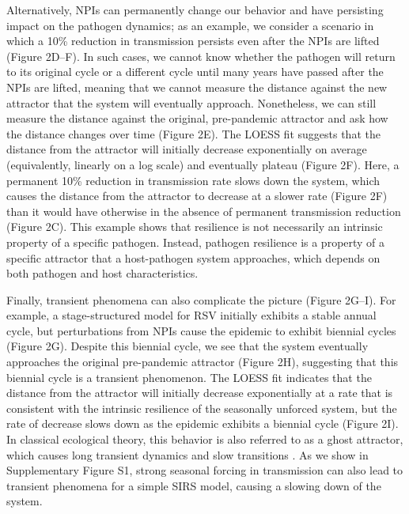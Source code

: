 \documentclass[12pt]{article}
\newcommand{\comment}{\showcomment}
\newcommand{\showcomment}[3]{\textcolor{#1}{\textbf{[#2: }\textsl{#3}\textbf{]}}}
\newcommand{\swp}[1]{\comment{magenta}{SWP}{#1}}
\begin{document}
Alternatively, NPIs can permanently change our behavior and have persisting impact on the pathogen dynamics; 
as an example, we consider a scenario in which a 10\% reduction in transmission persists even after the NPIs are lifted (Figure 2D--F).
In such cases, we cannot know whether the pathogen will return to its original cycle or a different cycle until many years have passed after the NPIs are lifted, meaning that we cannot measure the distance against the new attractor that the system will eventually approach.
Nonetheless, we can still measure the distance against the original, pre-pandemic attractor and ask how the distance changes over time (Figure 2E).
The LOESS fit suggests that the distance from the attractor will initially decrease exponentially on average (equivalently, linearly on a log scale) and eventually plateau (Figure 2F).
Here, a permanent 10\% reduction in transmission rate slows down the system, which causes the distance from the attractor to decrease at a slower rate (Figure 2F) than it would have otherwise in the absence of permanent transmission reduction (Figure 2C).
This example shows that resilience is not necessarily an intrinsic property of a specific pathogen.
Instead, pathogen resilience is a property of a specific attractor that a host-pathogen system approaches, which depends on both pathogen and host characteristics.

Finally, transient phenomena can also complicate the picture (Figure 2G--I).
For example, a stage-structured model for RSV initially exhibits a stable annual cycle, but perturbations from NPIs cause the epidemic to exhibit biennial cycles (Figure 2G).
Despite this biennial cycle, we see that the system eventually approaches the original pre-pandemic attractor (Figure 2H), suggesting that this biennial cycle is a transient phenomenon.
The LOESS fit indicates that the distance from the attractor will initially decrease exponentially at a rate that is consistent with the intrinsic resilience of the seasonally unforced system, but the rate of decrease slows down as the epidemic exhibits a biennial cycle (Figure 2I).
In classical ecological theory, this behavior is also referred to as a ghost attractor, which causes long transient dynamics and slow transitions \citep{hastings2018transient}.
As we show in Supplementary Figure S1, strong seasonal forcing in transmission can also lead to transient phenomena for a simple SIRS model, causing a slowing down of the system.
\end{document}

